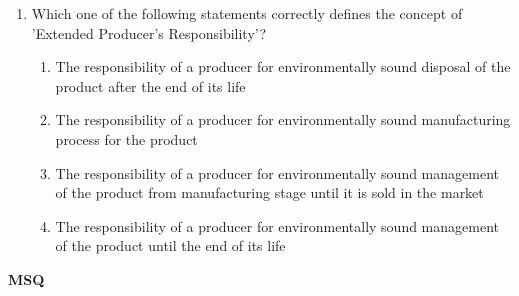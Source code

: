 \documentclass[12pt,a4paper]{article}
\begin{document}
\begin{enumerate}
   \item Which one of the following statements correctly defines the concept of 'Extended Producer's Responsibility'?
         \begin{enumerate}
            \item The responsibility of a producer for environmentally sound disposal of the product after the end of its life
            \item The responsibility of a producer for environmentally sound manufacturing process for the product
            \item The responsibility of a producer for environmentally sound management of the product from manufacturing stage until it is sold in the market
            \item The responsibility of a producer for environmentally sound management of the product until the end of its life
         \end{enumerate}
\end{enumerate}

\textbf{MSQ}
\end{document}
